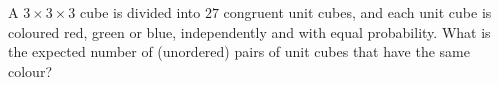 A $3\times3\times3$ cube is divided into $27$ congruent unit cubes, and each unit cube is coloured red, green or blue, independently and with equal probability. What is the expected number of (unordered) pairs of unit cubes that have the same colour?
